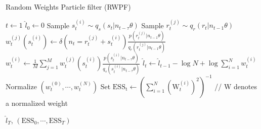 \documentclass[12pt]{article}
\begin{document}
	\begin{algorithm}
		\caption{Random Weights Particle filter (RWPF)}\label{RWPF}
		\begin{algorithmic}[1]
			\State $t \gets 1$
			\State $\hat{l}_0 \gets 0$
			\State Sample $s_t^{(i)} \sim q_s(s_t| n_{t-\tau} \theta)$
			\State Sample $r_t^{(j)} \sim q_r(r_t| n_{t-1} \theta)$
			\State $w_t^{(j)}(s_t^{(i)}) \gets \delta(n_t=r_t^{(j)}+s_t^{(i)})\frac{p(r_t^{(j)}| n_{t-1} \theta)}{q_r(r_t^{(j)}| n_{t-1} \theta)}$
			\EndFor
			\State $w_t^{(i)} \gets \frac{1}{M}\sum_{j=1}^{M}w_t^{(j)}(s_t^{(i)}) \frac{p(s_t^{(i)}| n_{t-\tau} \theta)}{q_s(s_t^{(i)}| n_{t-\tau} \theta)}$
			\EndFor
			\State $\hat{l}_t \gets \hat{l}_{t-1} - \log N + \log\sum_{i=1}^{N}w_t^{(i)}$
			\State Normalize $(w_t^{(0)}, \cdots, w_t^{(N)})$
			\State Set $\mathrm{ESS_t} \gets (\sum_{i=1}^{N}(\mathrm{W}_t^{(i)})^2)^{-1}$ // W denotes a normalized weight
			\EndWhile
			\item[]
			\Return $\hat{l}_T$,  $(\mathrm{ESS}_0, \cdots, \mathrm{ESS}_T)$
			\EndFunction
		\end{algorithmic}
	\end{algorithm}

\clearpage

	
	{}
	
\end{document}
